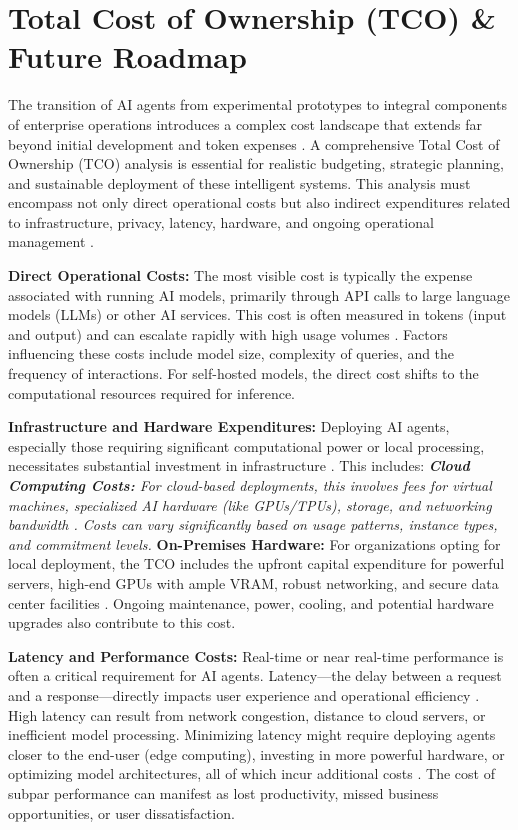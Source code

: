 \section{Total Cost of Ownership (TCO) \& Future Roadmap}

The transition of AI agents from experimental prototypes to integral components of enterprise operations introduces a complex cost landscape that extends far beyond initial development and token expenses \cite{Reger2026}. A comprehensive Total Cost of Ownership (TCO) analysis is essential for realistic budgeting, strategic planning, and sustainable deployment of these intelligent systems. This analysis must encompass not only direct operational costs but also indirect expenditures related to infrastructure, privacy, latency, hardware, and ongoing operational management \cite{Gartner2025}.

\textbf{Direct Operational Costs:} The most visible cost is typically the expense associated with running AI models, primarily through API calls to large language models (LLMs) or other AI services. This cost is often measured in tokens (input and output) and can escalate rapidly with high usage volumes \cite{Reger2026}. Factors influencing these costs include model size, complexity of queries, and the frequency of interactions. For self-hosted models, the direct cost shifts to the computational resources required for inference.

\textbf{Infrastructure and Hardware Expenditures:} Deploying AI agents, especially those requiring significant computational power or local processing, necessitates substantial investment in infrastructure \cite{Reger2026}. This includes: \textit{   \textbf{Cloud Computing Costs:} For cloud-based deployments, this involves fees for virtual machines, specialized AI hardware (like GPUs/TPUs), storage, and networking bandwidth \cite{Gartner2025}. Costs can vary significantly based on usage patterns, instance types, and commitment levels. }   \textbf{On-Premises Hardware:} For organizations opting for local deployment, the TCO includes the upfront capital expenditure for powerful servers, high-end GPUs with ample VRAM, robust networking, and secure data center facilities \cite{Reger2026}. Ongoing maintenance, power, cooling, and potential hardware upgrades also contribute to this cost.

\textbf{Latency and Performance Costs:} Real-time or near real-time performance is often a critical requirement for AI agents. Latency—the delay between a request and a response—directly impacts user experience and operational efficiency \cite{Reger2026}. High latency can result from network congestion, distance to cloud servers, or inefficient model processing. Minimizing latency might require deploying agents closer to the end-user (edge computing), investing in more powerful hardware, or optimizing model architectures, all of which incur additional costs \cite{Gartner2025}. The cost of subpar performance can manifest as lost productivity, missed business opportunities, or user dissatisfaction.

